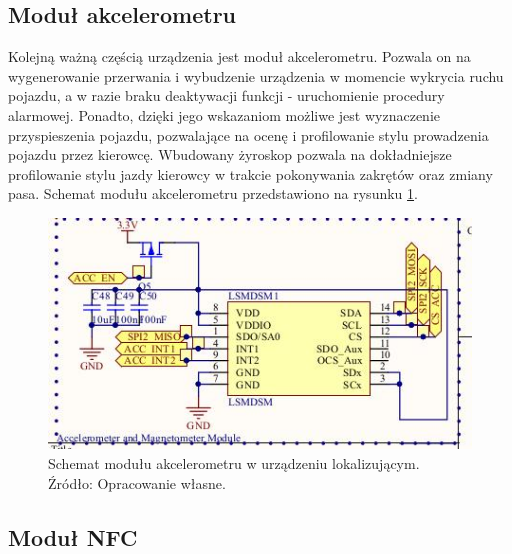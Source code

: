 \subsection{Moduł akcelerometru}

Kolejną ważną częścią urządzenia jest moduł akcelerometru. Pozwala on na wygenerowanie przerwania i wybudzenie urządzenia w momencie wykrycia ruchu pojazdu, a w razie braku deaktywacji funkcji - uruchomienie procedury alarmowej. Ponadto, dzięki jego wskazaniom możliwe jest wyznaczenie przyspieszenia pojazdu, pozwalające na ocenę i profilowanie stylu prowadzenia pojazdu przez kierowcę. Wbudowany żyroskop pozwala na dokładniejsze profilowanie stylu jazdy kierowcy w trakcie pokonywania zakrętów oraz zmiany pasa.
Schemat modułu akcelerometru przedstawiono na rysunku \ref{fig:image_mainboard_functional_accelerometer}.

\begin{figure}[H]
	\centering
	\includegraphics[width=12cm]{img/schematics/mainboard_functional_accelerometer.jpg}
	\caption{Schemat modułu akcelerometru w urządzeniu lokalizującym. \\ Źródło: Opracowanie własne.}
	\label{fig:image_mainboard_functional_accelerometer}
\end{figure}

\subsection{Moduł NFC}

